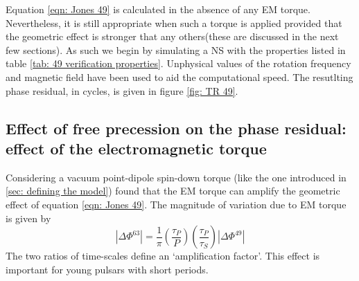 \documentclass[/home/greg/Thesis/main/main.tex]{subfiles}
\begin{document}
Equation \eqref{eqn: Jones 49} is calculated in the absence of any EM torque.
Nevertheless, it is still appropriate when such a torque is applied provided
that the geometric effect is stronger that any others(these are discussed in
the next few sections). As such we begin by simulating a NS with the properties
listed in table \ref{tab: 49 verification properties}. Unphysical values of the
rotation frequency and magnetic field have been used to aid the computational
speed. The resutlting phase residual, in cycles, is given in figure \ref{fig:
TR 49}.



\begin{figure}[htb]
\begin{floatrow}
\capbtabbox{%
  
}{%
  \caption{}%
  \label{tab: 49 verification properties}
}
\end{floatrow}
\end{figure}

\FloatBarrier
\subsection{Effect of free precession on the phase residual: effect of the electromagnetic
torque}
Considering a vacuum point-dipole spin-down torque (like the one introduced in 
\ref{sec: defining the model}) \citet{Jones2001} found that the EM torque can
amplify the geometric effect of equation \eqref{eqn: Jones 49}. The magnitude
of variation due to EM torque is given by 
\begin{equation}
    |\Delta\Phi^{63}| = \frac{1}{\pi}\left(\frac{\tau_{P}}{P}\right)
    \left(\frac{\tau_{P}}{\tau_{S}}\right) 
                                    |\Delta\Phi^{49}|
\label{eqn: Jones 63}
\end{equation}
The two ratios of time-scales define an `amplification factor'. This effect is
important for young pulsars with short periods.
\end{document}
